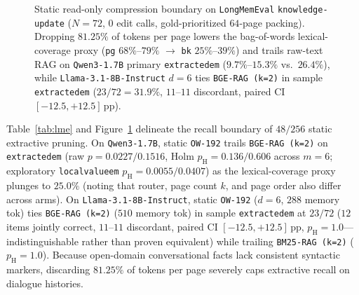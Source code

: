 \documentclass[11pt]{article}
\newcommand{\pp}{\,\text{pp}}
\renewcommand{\_}{\origunderscore\allowbreak}
\begin{document}
\begin{figure}[t]
\centering
{}
\caption{Static read-only compression boundary on \texttt{LongMemEval} \texttt{knowledge-update} ($N=72$, $0$ edit calls, gold-prioritized $64$-page packing). Dropping $81.25\%$ of tokens per page lowers the bag-of-words lexical-coverage proxy (\texttt{pg} $68\%$--$79\%$ $\rightarrow$ \texttt{bk} $25\%$--$39\%$) and trails raw-text RAG on \texttt{Qwen3-1.7B} primary \texttt{extracted\_em} ($9.7\%$--$15.3\%$ vs.\ $26.4\%$), while \texttt{Llama-3.1-8B-Instruct} $d=6$ ties \texttt{BGE-RAG (k=2)} in sample \texttt{extracted\_em} ($23/72 = 31.9\%$, $11$--$11$ discordant, paired CI $[-12.5, +12.5]\pp$).}
\label{fig:lme}
\end{figure}

Table~\ref{tab:lme} and Figure~\ref{fig:lme} delineate the recall boundary of $48/256$ static extractive pruning. On \texttt{Qwen3-1.7B}, static \texttt{OW-192} trails \texttt{BGE-RAG (k=2)} on \texttt{extracted\_em} (raw $p=0.0227 / 0.1516$, Holm $p_{\text{H}}=0.136 / 0.606$ across $m=6$; exploratory \texttt{local\_value\_em} $p_{\text{H}}=0.0055 / 0.0407$) as the lexical-coverage proxy plunges to $25.0\%$ (noting that router, page count $k$, and page order also differ across arms). On \texttt{Llama-3.1-8B-Instruct}, static \texttt{OW-192} ($d=6$, $288$ memory tok) ties \texttt{BGE-RAG (k=2)} ($510$ memory tok) in sample \texttt{extracted\_em} at $23/72$ ($12$ items jointly correct, $11$--$11$ discordant, paired CI $[-12.5, +12.5]\pp$, $p_{\text{H}}=1.0$---indistinguishable rather than proven equivalent) while trailing \texttt{BM25-RAG (k=2)} ($p_{\text{H}}=1.0$). Because open-domain conversational facts lack consistent syntactic markers, discarding $81.25\%$ of tokens per page severely caps extractive recall on dialogue histories.
\end{document}
